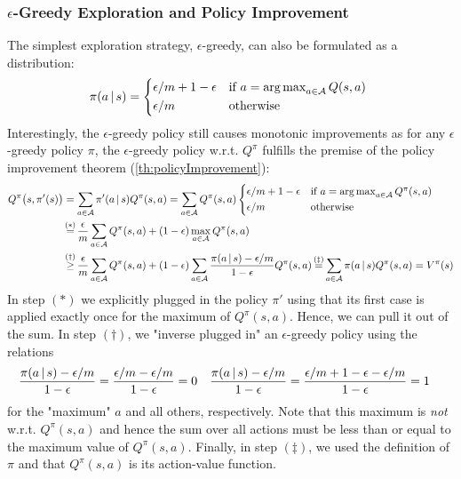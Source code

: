 			\subsubsection{\(\epsilon\)-Greedy Exploration and Policy Improvement}
				The simplest exploration strategy, \(\epsilon\)-greedy, can also be formulated as a distribution:
				\begin{equation}
					\pi(a \given s) =
						\begin{cases*}
							\epsilon/m + 1 - \epsilon & if \( a = \argmax_{a \in \mathcal{A}} Q(s, a) \) \\
							\epsilon/m                & otherwise
						\end{cases*}
				\end{equation}
				Interestingly, the \(\epsilon\)-greedy policy still causes monotonic improvements as for any \(\epsilon\)-greedy policy \(\pi\), the \(\epsilon\)-greedy policy w.r.t. \(Q^\pi\) fulfills the premise of the policy improvement theorem (\autoref{th:policyImprovement}):
				\begin{align}
					Q^\pi\bigl( s, \pi'(s) \bigr)
						&= \sum_{a \in \mathcal{A}} \pi'(a \given s) Q^\pi(s, a)
					 = \sum_{a \in \mathcal{A}} Q^\pi(s, a)
							\begin{cases*}
								\epsilon/m + 1 - \epsilon & if \( a = \argmax_{a \in \mathcal{A}} Q^\pi(s, a) \) \\
								\epsilon/m                & otherwise
							\end{cases*} \\
						&\overset{\mathclap{(\ast)}}{=} \frac{\epsilon}{m} \sum_{a \in \mathcal{A}} Q^\pi(s, a) + (1 - \epsilon) \max_{a \in \mathcal{A}} Q^\pi(s, a) \\
						&\overset{\mathclap{(\dagger)}}{\geq} \frac{\epsilon}{m} \sum_{a \in \mathcal{A}} Q^\pi(s, a) + (1 - \epsilon) \sum_{a \in \mathcal{A}} \frac{\pi(a \given s) - \epsilon/m}{1 - \epsilon} Q^\pi(s, a)
					 \overset{\mathclap{(\ddagger)}}{=} \sum_{a \in \mathcal{A}} \pi(a \given s) Q^\pi(s, a)
					 = V^\pi(s)
				\end{align}
				In step \((\ast)\) we explicitly plugged in the policy \(\pi'\) using that its first case is applied exactly once for the maximum of \(Q^\pi(s, a)\). Hence, we can pull it out of the sum. In step \((\dagger)\), we "inverse plugged in" an \(\epsilon\)-greedy policy using the relations
				\begin{align}
					\frac{\pi(a \,\vert\, s) - \epsilon/m}{1 - \epsilon} &= \frac{\epsilon/m - \epsilon/m}{1 - \epsilon} = 0 &
					\frac{\pi(a \,\vert\, s) - \epsilon/m}{1 - \epsilon} &= \frac{\epsilon/m + 1 - \epsilon - \epsilon/m}{1 - \epsilon} = 1
				\end{align}
				for the "maximum" \(a\) and all others, respectively. Note that this maximum is \emph{not} w.r.t. \( Q^\pi(s, a) \) and hence the sum over all actions must be less than or equal to the maximum value of \(Q^\pi(s, a)\). Finally, in step \((\ddagger)\), we used the definition of \(\pi\) and that \(Q^\pi(s, a)\) is its action-value function.

